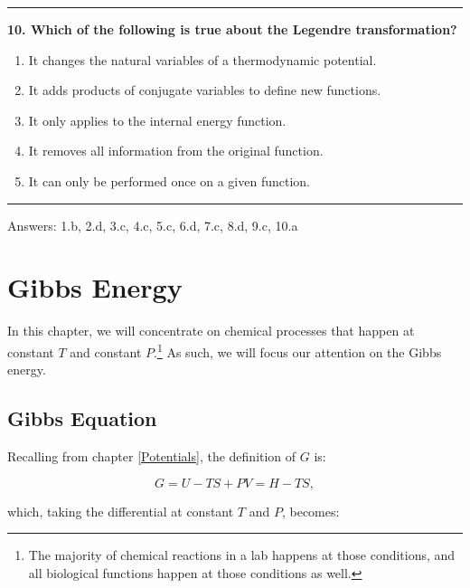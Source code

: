\documentclass[
  9pt,
]{extbook}
\providecommand{\tightlist}{%
  \setlength{\itemsep}{0pt}\setlength{\parskip}{0pt}}
\theoremstyle{definition}
\theoremstyle{definition}
\theoremstyle{definition}
\theoremstyle{definition}
\theoremstyle{remark}
\begin{document}
\begin{center}\rule{0.5\linewidth}{0.5pt}\end{center}

\textbf{10. Which of the following is true about the Legendre transformation?}

\begin{enumerate}
\def\labelenumi{\alph{enumi}.}
\tightlist
\item
  It changes the natural variables of a thermodynamic potential.
\item
  It adds products of conjugate variables to define new functions.
\item
  It only applies to the internal energy function.
\item
  It removes all information from the original function.
\item
  It can only be performed once on a given function.
\end{enumerate}

\begin{center}\rule{0.5\linewidth}{0.5pt}\end{center}

Answers: 1.b, 2.d, 3.c, 4.c, 5.c, 6.d, 7.c, 8.d, 9.c, 10.a

\renewcommand*{\standardstate}{{-\kern-6pt{\ominus}\kern-6pt-}}

\chapter{Gibbs Energy}\label{GibbsFree}

In this chapter, we will concentrate on chemical processes that happen at constant \(T\) and constant \(P\).\footnote{The majority of chemical reactions in a lab happens at those conditions, and all biological functions happen at those conditions as well.} As such, we will focus our attention on the Gibbs energy.

\section{Gibbs Equation}\label{gibbseqsec}

Recalling from chapter \ref{Potentials}, the definition of \(G\) is:

\begin{equation}
G = U -TS +PV = H-TS,
\label{eq:dgdeftot}
\end{equation}

which, taking the differential at constant \(T\) and \(P\), becomes:
\end{document}
